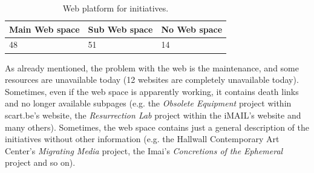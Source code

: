 \begin{table}[!h]
\centering
\begin{adjustbox}{max width=\textwidth}
\begin{tabular}{|l|l|l|} \hline
Main Web space & Sub Web space & No Web space \\\hline
48             & 51            & 14           \\\hline
\end{tabular}
\end{adjustbox}
\caption{\label{tab:web_plaforma_for_initiatives}Web platform for initiatives.}
\end{table}

As already mentioned, the problem with the web is the maintenance, and some resources are unavailable today (12 websites are completely unavailable today). Sometimes, even if the web space is apparently working, it contains death links and no longer available subpages (e.g. the\textit{ Obsolete Equipment} project within scart.be’s website, the \textit{Resurrection Lab} project within the iMAIL’s website and many others). Sometimes, the web space contains just a general description of the initiatives without other information (e.g. the Hallwall Contemporary Art Center’s \textit{Migrating Media} project, the Imai’s \textit{Concretions of the Ephemeral} project and so on).

